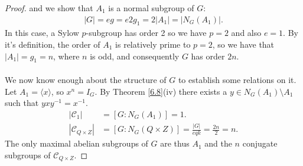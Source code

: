 \begin{proof}
and we show that $A_1$ is a normal subgroup of $G$:
\begin{align*} |G| = eg = e2g_1 = 2|A_1| = |N_G(A_1)|. 
\end{align*}
In this case, a Sylow $p$-subgroup has order 2 so we have $p=2$ and also $e=1$. By it's definition, the order of $A_1$ is relatively prime to $p=2$, so we have that $|A_1|= g_1 = n$, where $n$ is odd, and consequently $G$ has order $2n$. \\  
\\
We now know enough about the structure of $G$ to establish some relations on it. Let $A_1 = \langle x \rangle$, so $x^n = I_G$. By Theorem \ref{6.8}(iv) there exists a $y \in N_G(A_1) \! \setminus \! A_1$ such that $y x y^{-1} = x^{-1}$.
\begin{align*} |\mathcal{C}_1| &= [G : N_G(A_1)] = 1.
\\ |\mathcal{C}_{Q \times Z}| &= [G : N_G(Q \times Z)] = \frac{|G|}{eqk} = \frac{2n}{2} = n.
\end{align*}
The only maximal abelian subgroups of $G$ are thus $A_1$ and the $n$ conjugate subgroups of $\mathcal{C}_{Q \times Z}$.








\end{proof}
